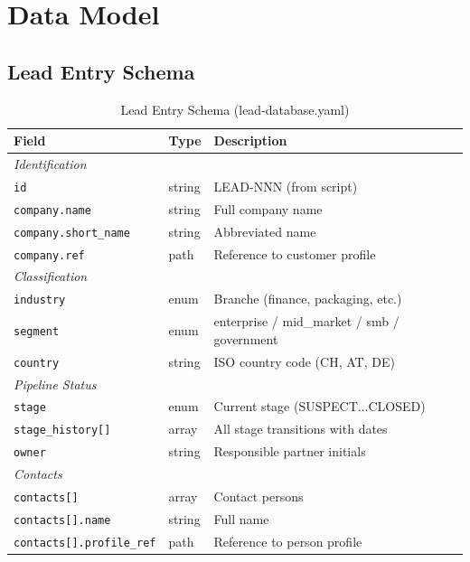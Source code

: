 \section{Data Model}
\label{sec:bn-data-model}

\subsection{Lead Entry Schema}

\begin{table}[htbp]
\centering
\caption{Lead Entry Schema (lead-database.yaml)}
\label{tab:bn-schema}
\renewcommand{\arraystretch}{1.2}
\begin{tabular}{@{}p{3.5cm}p{2cm}p{6cm}@{}}
\toprule
\textbf{Field} & \textbf{Type} & \textbf{Description} \\
\midrule
\multicolumn{3}{l}{\textit{Identification}} \\
\texttt{id} & string & LEAD-NNN (from script) \\
\texttt{company.name} & string & Full company name \\
\texttt{company.short\_name} & string & Abbreviated name \\
\texttt{company.ref} & path & Reference to customer profile \\
\midrule
\multicolumn{3}{l}{\textit{Classification}} \\
\texttt{industry} & enum & Branche (finance, packaging, etc.) \\
\texttt{segment} & enum & enterprise / mid\_market / smb / government \\
\texttt{country} & string & ISO country code (CH, AT, DE) \\
\midrule
\multicolumn{3}{l}{\textit{Pipeline Status}} \\
\texttt{stage} & enum & Current stage (SUSPECT...CLOSED) \\
\texttt{stage\_history[]} & array & All stage transitions with dates \\
\texttt{owner} & string & Responsible partner initials \\
\midrule
\multicolumn{3}{l}{\textit{Contacts}} \\
\texttt{contacts[]} & array & Contact persons \\
\texttt{contacts[].name} & string & Full name \\
\texttt{contacts[].profile\_ref} & path & Reference to person profile \\

\end{tabular}
\end{table}
